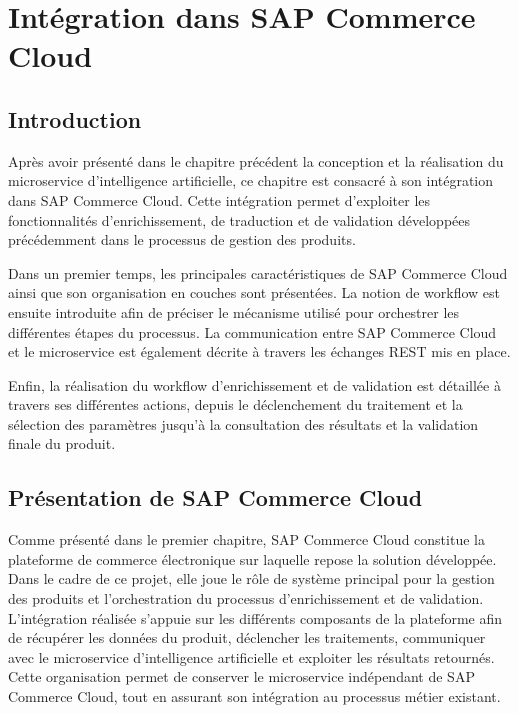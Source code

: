 ﻿\chapter{Intégration dans SAP Commerce Cloud}

\section{Introduction}

Après avoir présenté dans le chapitre précédent la conception et la réalisation du microservice d'intelligence artificielle, ce chapitre est consacré à son intégration dans SAP Commerce Cloud. Cette intégration permet d'exploiter les fonctionnalités d'enrichissement, de traduction et de validation développées précédemment dans le processus de gestion des produits.

Dans un premier temps, les principales caractéristiques de SAP Commerce Cloud ainsi que son organisation en couches sont présentées. La notion de workflow est ensuite introduite afin de préciser le mécanisme utilisé pour orchestrer les différentes étapes du processus. La communication entre SAP Commerce Cloud et le microservice est également décrite à travers les échanges REST mis en place.

Enfin, la réalisation du workflow d'enrichissement et de validation est détaillée à travers ses différentes actions, depuis le déclenchement du traitement et la sélection des paramètres jusqu'à la consultation des résultats et la validation finale du produit.

\section{Présentation de SAP Commerce Cloud}

Comme présenté dans le premier chapitre, SAP Commerce Cloud constitue la plateforme de commerce électronique sur laquelle repose la solution développée. Dans le cadre de ce projet, elle joue le rôle de système principal pour la gestion des produits et l'orchestration du processus d'enrichissement et de validation.
\newpage
L'intégration réalisée s'appuie sur les différents composants de la plateforme afin de récupérer les données du produit, déclencher les traitements, communiquer avec le microservice d'intelligence artificielle et exploiter les résultats retournés. Cette organisation permet de conserver le microservice indépendant de SAP Commerce Cloud, tout en assurant son intégration au processus métier existant.

